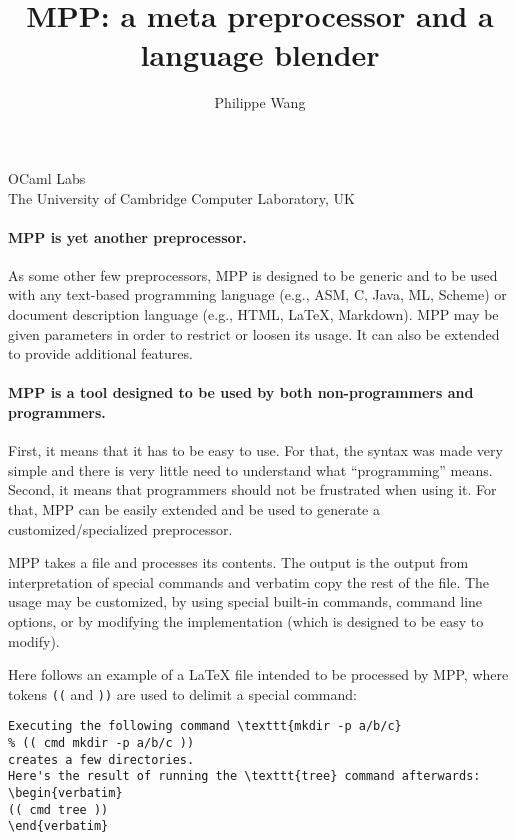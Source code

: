 \documentclass[a4paper]{article}
\title{MPP: a meta preprocessor and a language blender}
\author{Philippe Wang}
\begin{document}
\maketitle
\begin{center}
  OCaml Labs\\
  The University of Cambridge Computer Laboratory, UK\\
\end{center}
\paragraph{MPP is yet another preprocessor.}
As some other few preprocessors, MPP
is  designed  to  be  generic  and  to be  used  with  any  text-based
programming  language (e.g.,  ASM, C,  Java, ML,  Scheme)  or document
description language  (e.g., HTML, LaTeX, Markdown). MPP  may be given
parameters in  order to restrict or  loosen its usage. It  can also be
extended to provide additional features.

\paragraph{MPP  is  a tool  designed  to  be used  by  both  non-programmers  and
programmers.} First, it means that it  has to be easy to use. For that,
the  syntax was  made very  simple and  there is  very little  need to
understand  what   ``programming''  means.   Second,   it  means  that
programmers should not be frustrated  when using it. For that, MPP can
be easily  extended and be  used to generate  a customized/specialized
preprocessor.

MPP takes a file and processes its contents.  The output is the output
from interpretation of special commands  and verbatim copy the rest of
the  file.  The  usage may  be customized,  by using  special built-in
commands,  command line  options, or  by modifying  the implementation
(which is designed to be easy to modify).

Here follows an example of a LaTeX file intended to be processed by MPP,
where tokens \texttt{((} and \texttt{))} are used to delimit a special 
command:
\begin{lstlisting}
Executing the following command \texttt{mkdir -p a/b/c} 
% (( cmd mkdir -p a/b/c ))
creates a few directories.
Here's the result of running the \texttt{tree} command afterwards:
\begin{verbatim}
(( cmd tree ))
\end{verbatim}
\end{lstlisting}
\end{document}
